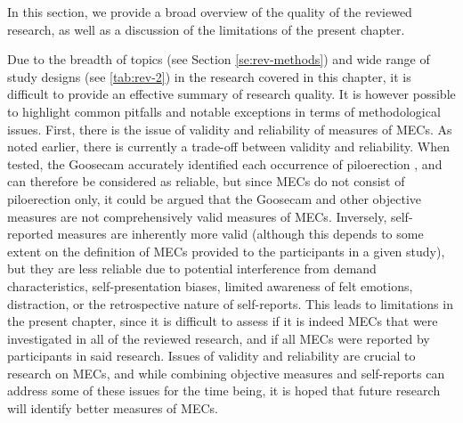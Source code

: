 In this section, we provide a broad overview of the quality of the reviewed research, as well as a discussion of the limitations of the present chapter.

Due to the breadth of topics (see Section \ref{se:rev-methods}) and wide range of study designs (see \autoref{tab:rev-2}) in the research covered in this chapter, it is difficult to provide an effective summary of research quality. It is however possible to highlight common pitfalls and notable exceptions in terms of methodological issues. First, there is the issue of validity and reliability of measures of MECs. As noted earlier, there is currently a trade-off between validity and reliability. When tested, the Goosecam accurately identified each occurrence of piloerection \parencite{benedek2010}, and can therefore be considered as reliable, but since MECs do not consist of piloerection only, it could be argued that the Goosecam and other objective measures are not comprehensively valid measures of MECs. Inversely, self-reported measures are inherently more valid (although this depends to some extent on the definition of MECs provided to the participants in a given study), but they are less reliable due to potential interference from demand characteristics, self-presentation biases, limited awareness of felt emotions, distraction, or the retrospective nature of self-reports. This leads to limitations in the present chapter, since it is difficult to assess if it is indeed MECs that were investigated in all of the reviewed research, and if all MECs were reported by participants in said research. Issues of validity and reliability are crucial to research on MECs, and while combining objective measures and self-reports can address some of these issues for the time being, it is hoped that future research will identify better measures of MECs.


